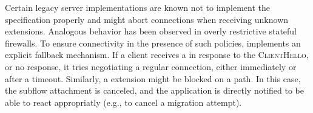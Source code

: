 Certain legacy \tls server implementations are known not to implement the \tls
specification properly and might abort connections when receiving unknown \tls
extensions. Analogous behavior has been observed in overly restrictive stateful
firewalls. To ensure connectivity in the presence of such policies, \tcpls
implements an explicit fallback mechanism. If a client receives a \tcp \rst in
response to the \tcpls \textsc{ClientHello}, or no response, it
tries negotiating a regular \tls connection, either
immediately or after a timeout. Similarly, a \tcpls \join extension might be
blocked on a path. In this case, the subflow attachment is canceled, and
the application is directly notified to be able to react appropriatly (e.g.,
to cancel a migration attempt).



